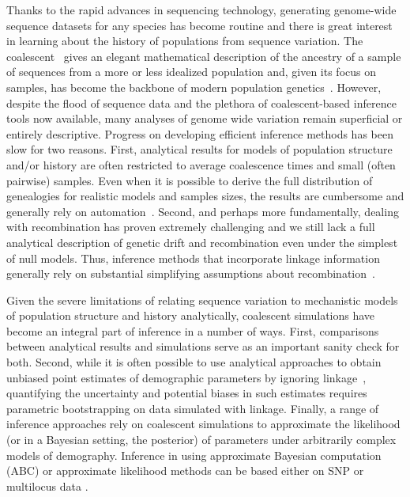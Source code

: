 \documentclass[graybox]{svmult}
\begin{document}
Thanks to the rapid advances in sequencing technology, generating
genome-wide sequence datasets for any species has become routine and
there is great interest in learning about the history of
populations from sequence variation. The
coalescent~\citep{hudson1983testing,kingman1982coalescent}
gives an
elegant mathematical description of the ancestry of a sample of
sequences from a more or less idealized population and, given its focus
on samples, has become the backbone of modern population
genetics~\citep{hudson1990gene,Wakeley2009}.
However, despite the flood of sequence data and the plethora of
coalescent-based inference tools now available, many analyses of genome
wide variation remain superficial or entirely descriptive. Progress on
developing efficient inference methods has been slow for two reasons.
First, analytical results for models of population structure and/or history are
often restricted to average coalescence times and small (often pairwise)
samples. Even when it is possible to derive the full distribution of
genealogies for realistic models and samples sizes, the results are
cumbersome and generally rely on automation~\citep{Lohse2016}. Second, and
perhaps more fundamentally, dealing with recombination has proven
extremely challenging and we still lack a full analytical description of
genetic drift and recombination even under the simplest of null models.
Thus, inference methods that
incorporate linkage information generally rely on substantial simplifying
assumptions about recombination~\citep{mcvean2005approximating}.

Given the severe limitations of relating sequence variation to mechanistic
models of population structure and history analytically, coalescent simulations
have become an integral part of inference in a number of ways. First,
comparisons between analytical results and simulations serve as an important
sanity check for both. Second, while it is often possible to use analytical
approaches to obtain unbiased point estimates of demographic parameters by
ignoring linkage~\citep{gutenkunst2009inferring}, quantifying the uncertainty
and potential biases in such estimates requires parametric bootstrapping on
data simulated with linkage. Finally, a range of inference approaches rely on
coalescent simulations to approximate the likelihood (or in a Bayesian setting,
the posterior) of parameters under arbitrarily complex models of demography.
Inference in using approximate Bayesian computation (ABC) \citep{Beaumont2002,
Cornuet2008} or approximate likelihood methods can be based either on SNP
\citep{excoffier2013} or multilocus data \citep{becquet2007new, Beeravolu2017}.
\end{document}
